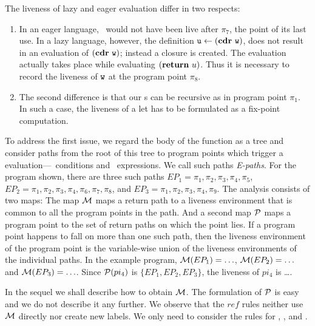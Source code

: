 \documentclass{sig-alternate}
\begin{document}
The liveness of lazy and eager evaluation differ in two respects:
\begin{enumerate}
\item  In an  eager  language, \pw\  would  not have  been live  after
  $\pi_7$, the point of its last use. In a lazy language, however, the
  definition  $\mbox{\tt u}  \leftarrow  (\mbox{$\mathbf{cdr}$}~\mbox{\tt w})$,  does not  result  in  an
  evaluation  of  $(\mbox{$\mathbf{cdr}$}~\mbox{\tt w})$; instead  a  closure  is created.   The
  evaluation actually takes place while evaluating $(\mbox{$\mathbf{ return}$}~u)$. Thus
  it is necessary to record the liveness of $\mbox{\tt w}$ at the program point
  $\pi_8$.

\item The second difference is that  our \LET s can be recursive as in
  program point $\pi_1$.  In such a case, the liveness of a let has to
  be formulated as a fix-point computation.
\end{enumerate}

  To address the first issue, we  regard the body of the function as a
  tree and consider paths from the root of this tree to program points
  which     trigger     a     evaluation---\SIF\    conditions     and
  \RETURN\  expressions. We call  such paths  {\em E-paths}.   For the
  program  shown, there  are three  such paths  $EP_1 =  \pi_1, \pi_2,
  \pi_3,  \pi_4, \pi_5$, $EP_2  = \pi_1,  \pi_2, \pi_3,  \pi_4, \pi_6,
  \pi_7, \pi_8$, and $EP_3 =  \pi_1, \pi_2, \pi_3, \pi_4, \pi_9$.  The
  analysis consists of two maps:  The map $\cal{M}$ maps a return path
  to a liveness  environment that is common to  all the program points
  in the path. And a second  map $\cal{P}$ maps a program point to the
  set of  return paths on  which the point  lies.  If a  program point
  happens  to fall  on  more than  one  such path,  then the  liveness
  environment of the  program point is the variable-wise  union of the
  liveness  environments  of the  individual  paths.   In the  example
  program,  ${\cal  M}(EP_1)=  \ldots$,  ${\cal  M}(EP_2)=\ldots$  and
  ${\cal M}(EP_3)= \ldots$.  Since  ${\cal P}(pi_4)$ is $\lbrace EP_1,
  EP_2, EP_3 \rbrace$, the liveness of $pi_4$ is \ldots.

  In  the  sequel we  shall  describe  how  to obtain  $\cal{M}$.  The
  formulation  of $\cal{P}$  is easy  and we  do not  describe  it any
  further.
  We observe that the ${ref}$ rules neither use ${\cal M}$ directly nor 
  create new labels. We only need to consider the rules for {\LET}, {\SIF}, and
  {\RETURN}.
\end{document}
